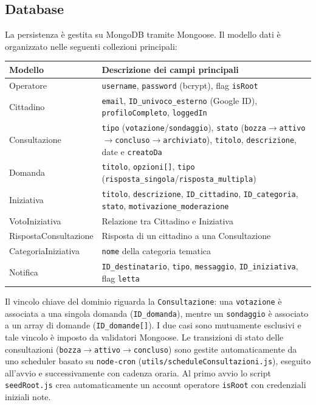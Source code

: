 \documentclass{article}
\newcommand{\code}[1]{\texttt{\small #1}}
\begin{document}
\subsection{Database}

La persistenza è gestita su MongoDB tramite Mongoose. Il modello dati è organizzato nelle
seguenti collezioni principali:

\renewcommand{\arraystretch}{1.15}
\begin{longtable}{L{4cm} L{9cm}}
	\toprule
	\textbf{Modello} & \textbf{Descrizione dei campi principali} \\
	\midrule
	\endhead
	Operatore            & \code{username}, \code{password} (bcrypt), flag \code{isRoot} \\
	Cittadino            & \code{email}, \code{ID\_univoco\_esterno} (Google ID),
	                       \code{profiloCompleto}, \code{loggedIn} \\
	Consultazione        & \code{tipo} (\code{votazione}/\code{sondaggio}),
	                       \code{stato} (\code{bozza}$\to$\code{attivo}$\to$\code{concluso}$\to$\code{archiviato}),
	                       \code{titolo}, \code{descrizione}, date e \code{creatoDa} \\
	Domanda              & \code{titolo}, \code{opzioni[]},
	                       \code{tipo} (\code{risposta\_singola}/\code{risposta\_multipla}) \\
	Iniziativa           & \code{titolo}, \code{descrizione}, \code{ID\_cittadino},
	                       \code{ID\_categoria}, \code{stato}, \code{motivazione\_moderazione} \\
	VotoIniziativa       & Relazione tra Cittadino e Iniziativa \\
	RispostaConsultazione& Risposta di un cittadino a una Consultazione \\
	CategoriaIniziativa  & \code{nome} della categoria tematica \\
	Notifica             & \code{ID\_destinatario}, \code{tipo}, \code{messaggio},
	                       \code{ID\_iniziativa}, flag \code{letta} \\
	\bottomrule
\end{longtable}

Il vincolo chiave del dominio riguarda la \code{Consultazione}: una \code{votazione} è
associata a una singola domanda (\code{ID\_domanda}), mentre un \code{sondaggio} è associato a
un array di domande (\code{ID\_domande[]}). I due casi sono mutuamente esclusivi e tale
vincolo è imposto da validatori Mongoose. Le transizioni di stato delle consultazioni
(\code{bozza}$\to$\code{attivo}$\to$\code{concluso}) sono gestite automaticamente da uno
scheduler basato su \code{node-cron} (\code{utils/scheduleConsultazioni.js}), eseguito
all'avvio e successivamente con cadenza oraria. Al primo avvio lo script \code{seedRoot.js}
crea automaticamente un account operatore \code{isRoot} con credenziali iniziali note.
\end{document}
